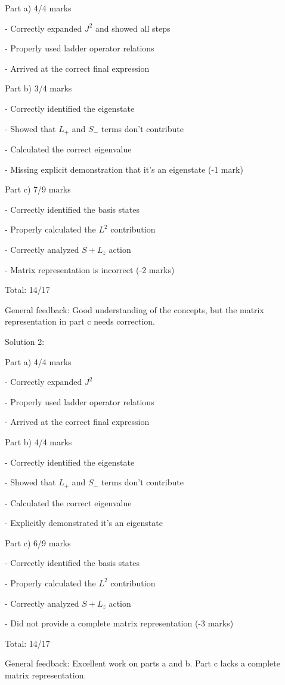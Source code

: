 \documentclass[a4paper,11pt]{article}
\begin{document}
Part a) 4/4 marks

- Correctly expanded \(J^2\) and showed all steps

- Properly used ladder operator relations

- Arrived at the correct final expression

Part b) 3/4 marks

- Correctly identified the eigenstate

- Showed that \(L_+\) and \(S_-\) terms don't contribute

- Calculated the correct eigenvalue

- Missing explicit demonstration that it's an eigenstate (-1 mark)

Part c) 7/9 marks

- Correctly identified the basis states

- Properly calculated the \(L^2\) contribution

- Correctly analyzed \(S+L_z\) action

- Matrix representation is incorrect (-2 marks)

Total: 14/17

General feedback: Good understanding of the concepts, but the matrix representation in part c needs correction.

Solution 2:

Part a) 4/4 marks

- Correctly expanded \(J^2\)

- Properly used ladder operator relations

- Arrived at the correct final expression

Part b) 4/4 marks

- Correctly identified the eigenstate

- Showed that \(L_+\) and \(S_-\) terms don't contribute

- Calculated the correct eigenvalue

- Explicitly demonstrated it's an eigenstate

Part c) 6/9 marks

- Correctly identified the basis states

- Properly calculated the \(L^2\) contribution

- Correctly analyzed \(S+L_z\) action

- Did not provide a complete matrix representation (-3 marks)

Total: 14/17

General feedback: Excellent work on parts a and b. Part c lacks a complete matrix representation.
\end{document}

